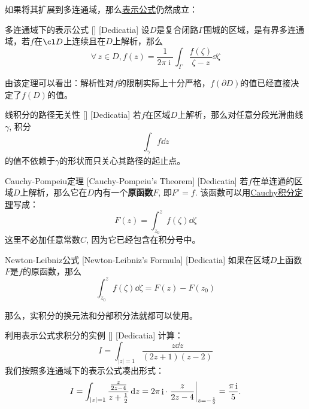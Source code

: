 \documentclass[UTF8]{ctexart}
\DeclareMathOperator{\ii}{\mathrm{i}}
\newcommand{\CauchyThm}{\hyperref[thm:Cauchy]{Cauchy积分定理}}
\begin{document}
如果将其扩展到多连通域，那么\hyperref[crl:CauchyRepresenting]{表示公式}仍然成立：
\begin{crl}
    [UUID]
    {多连通域下的表示公式}
    []
    [Dedicatia]
    设$D$是复合闭路$\Gamma$围城的区域，是有界多连通域，若$f$在$\cl D$上连续且在$D$上解析，那么
    \[\forall\, z\in D, f(z)=\frac{1}{2\pi\ii}\int_\Gamma\frac{f(\zeta)}{\zeta-z}\dd{\zeta} \]
\end{crl}
由该定理可以看出：解析性对$f$的限制实际上十分严格，$f(\partial D)$的值已经直接决定了$f(D)$的值。
\begin{crl}
    [UUID]
    {线积分的路径无关性}
    []
    [Dedicatia]
    若$f$在区域$D$上解析，那么对任意分段光滑曲线$\gamma$, 积分
    \[\int_\gamma f\dd{z}\]
    的值不依赖于$\gamma$的形状而只关心其路径的起止点。
\end{crl}
\begin{thm}
    [UUID]
    {Cauchy-Pompeiu定理}
    [Cauchy-Pompeiu's Theorem]
    [Dedicatia]
    若$f$在单连通的区域$D$上解析，那么它在$D$内有一个\textbf{原函数}$F$, 即$F'=f$. 该函数可以用\CauchyThm 写成：
    \[F(z)=\int_{z_0}^z f(\zeta)\dd{\zeta}\]
    这里不必加任意常数$C$, 因为它已经包含在积分号中。
\end{thm}
\begin{thm}
    [UUID]
    {Newton-Leibniz公式}
    [Newton-Leibniz's Formula]
    [Dedicatia]
    如果在区域$D$上函数$F$是$f$的原函数，那么
    \[\int_{z_0}^z f(\zeta)\dd{\zeta}=F(z)-F(z_0)\]
\end{thm}
那么，实积分的换元法和分部积分法就都可以使用。
\begin{xmp}
    [UUID]
    {利用表示公式求积分的实例}
    []
    [Dedicatia]
    计算：
    \[I=\int_{|z|=1}\frac{z\dd{z}}{(2z+1)(z-2)}\]
    我们按照多连通域下的表示公式凑出形式：
    \[I=\int_{|z|=1}\frac{\frac{z}{2z-4}}{z+\frac{1}{2}}\dd{z}=2\pi\ii\cdot\eval{\frac{z}{2z-4}}_{z=-\frac{1}{2}}=\frac{\pi\ii}{5}.\]
\end{xmp}
\end{document}
